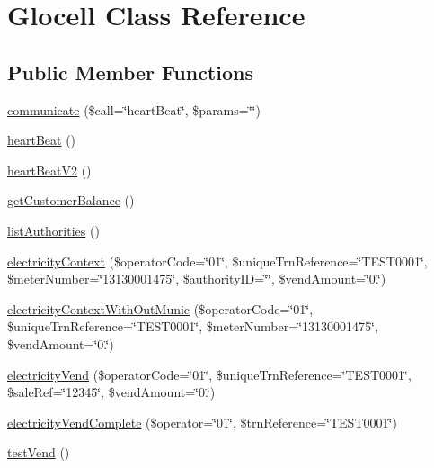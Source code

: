 \hypertarget{classGlocell}{}\section{Glocell Class Reference}
\label{classGlocell}
\subsection*{Public Member Functions}
\begin{DoxyCompactItemize}
\item 
\hyperlink{classGlocell_a161d3073a9a8d32cfe4e90999bc4c259}{communicate} (\$call=\char`\"{}heart\+Beat\char`\"{}, \$params=\char`\"{}\char`\"{})
\item 
\hyperlink{classGlocell_a70fae11fbbcdd45faf8719cc5dd2cdca}{heart\+Beat} ()
\item 
\hyperlink{classGlocell_ac7d3b647eda88e91e21b631823c223b1}{heart\+Beat\+V2} ()
\item 
\hyperlink{classGlocell_a0fbe51f01c43f917c13cd32bdac439dc}{get\+Customer\+Balance} ()
\item 
\hyperlink{classGlocell_a0c37bb8d4d83db39d686fd622ba9e1a9}{list\+Authorities} ()
\item 
\hyperlink{classGlocell_a5ef9ef1ba7edd477090c68cb7cfc3309}{electricity\+Context} (\$operator\+Code=\char`\"{}01\char`\"{}, \$unique\+Trn\+Reference=\char`\"{}T\+E\+S\+T0001\char`\"{}, \$meter\+Number=\char`\"{}13130001475\char`\"{}, \$authority\+I\+D=\char`\"{}\char`\"{}, \$vend\+Amount=\char`\"{}0.\char`\"{})
\item 
\hyperlink{classGlocell_acc0d827cadf24bc487c55642dce05939}{electricity\+Context\+With\+Out\+Munic} (\$operator\+Code=\char`\"{}01\char`\"{}, \$unique\+Trn\+Reference=\char`\"{}T\+E\+S\+T0001\char`\"{}, \$meter\+Number=\char`\"{}13130001475\char`\"{}, \$vend\+Amount=\char`\"{}0.\char`\"{})
\item 
\hyperlink{classGlocell_aaec3a9c0d2570e1789597bc3fe368609}{electricity\+Vend} (\$operator\+Code=\char`\"{}01\char`\"{}, \$unique\+Trn\+Reference=\char`\"{}T\+E\+S\+T0001\char`\"{}, \$sale\+Ref=\char`\"{}12345\char`\"{}, \$vend\+Amount=\char`\"{}0.\char`\"{})
\item 
\hyperlink{classGlocell_afedf7f954a1b730847f39afc904c7ff5}{electricity\+Vend\+Complete} (\$operator=\char`\"{}01\char`\"{}, \$trn\+Reference=\char`\"{}T\+E\+S\+T0001\char`\"{})
\item 
\hyperlink{classGlocell_ad51e9b4e84f40bf3785446b1a113eb3e}{test\+Vend} ()
\end{DoxyCompactItemize}


